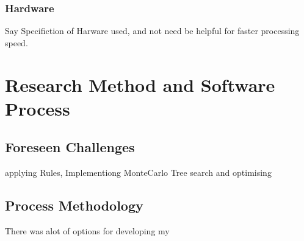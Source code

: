 \subsubsection{Hardware}
Say Specifiction of Harware used, and not need be helpful for faster processing speed.
\section{Research Method and Software Process}
\subsection {Foreseen Challenges}
applying Rules, Implementiong MonteCarlo Tree search and optimising
\subsection {Process Methodology}
There was alot of options for developing my